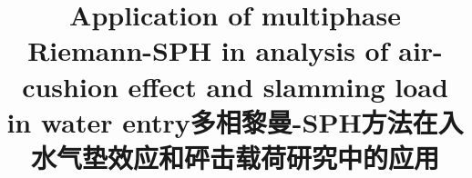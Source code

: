 \documentclass[UTF8]{ctexart}
\begin{document}
{
    \title{Application of multiphase Riemann-SPH in analysis of air-cushion effect and slamming load in water entry}
    \title{多相黎曼-SPH方法在入水气垫效应和砰击载荷研究中的应用}
}

    
\clearpage

\tableofcontents
\pagebreak
















\end{document}
